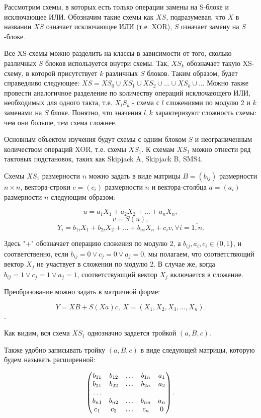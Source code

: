 \documentclass[a4paper,12pt]{report}
\theoremstyle{plain} %
\theoremstyle{definition}
\theoremstyle{remark}
\begin{document}
\begin{large}
Рассмотрим схемы, в которых есть только операции замены на S-блоке и исключающее ИЛИ. Обозначим такие схемы как $XS$, подразумевая, что $X$ в названии $XS$ означает исключающее ИЛИ (т.е. XOR), $S$ означает замену на $S$-блоке. 

Все XS-схемы можно разделить на классы в зависимости от того, сколько различных $S$ блоков используется внутри схемы. Так, $XS_k$ обозначает такую XS-схему, в которой присутствует $k$ различных $S$ блоков. Таким образом, будет справедливо следующее: $XS = XS_0 \cup XS_1 \cup XS_2 \cup ... \cup XS_k \cup...$ Можно также провести аналогичное разделение по количеству операций исключающего ИЛИ, необходимых для одного такта, т.е. $X_lS_k$ - схема с $l$ сложениями по модулю 2 и $k$ заменами на $S$ блоке. Понятно, что значения $l, k$ характеризуют сложность схемы: чем они больше, тем схема сложнее.

Основным объектом изучения будут схемы с одним блоком $S$ и неограниченным количеством операций XOR, т.е. схемы $XS_1$. К схемам $XS_1$ можно отнести ряд тактовых подстановок, таких как Skipjack A, Skipjack B, SMS4. 

Схемы $XS_1$ размерности $n$ можно задать в виде матрицы $B = (b_{ij})$ размерности $n \times n$, вектора-строки $c = (c_i)$ размерности $n$ и вектора-столбца $a=(a_i)$ размерности $n$ следующим образом:

$$u = a_1X_1 + a_2X_2 + ... + a_nX_n,$$
$$v = S(u),$$
$$Y_i = b_{1i}X_1 + b_{2i}X_2 + ... + b_{ni}X_n + c_iv, \forall i = \overline{1,n}.$$

Здесь "+" обозначает операцию сложения по модулю 2, а $b_{ij}, a_i, c_i \in \{0, 1\}$, и соответственно, если $b_{ij} = 0 \vee c_j=0 \vee a_j = 0$, мы полагаем, что соответствющий вектор $X_j$ не участвует в сложении по модулю 2. В случае же, когда $b_{ij} = 1 \vee c_j=1 \vee a_j = 1$, соответствующий вектор $X_j$ включается в сложение.

Преобразование можно задать в матричной форме:

$$Y = XB + S(Xa)c, ~X = (X_1, X_2, X_3, ..., X_n).$$.

Как видим, вся схема $XS_1$ однозначно задается тройкой $(a, B, c)$. 

Также удобно записывать тройку $(a, B, c)$ в виде следующей матрицы, которую будем называть расширенной:

$$
\begin{pmatrix}
b_{11} & b_{12} & \ldots & b_{1n} & a_1\\
b_{21} & b_{22} & \ldots & b_{2n} & a_2\\
\dotfill\\
b_{n1} & b_{n2} & \ldots & b_{nn} & a_n\\
c_1    & c_2    & \ldots & c_n    & 0\\
\end{pmatrix}.
$$


\end{large}
\end{document}

